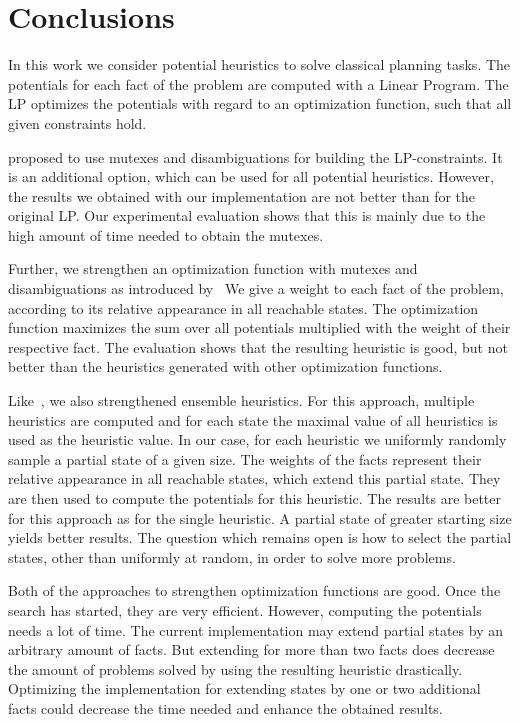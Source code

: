 \chapter{Conclusions}\label{ch:conclusions}
In this work we consider potential heuristics to solve classical planning tasks.
The potentials for each fact of the problem are computed with a Linear Program.
The LP optimizes the potentials with regard to an optimization function, such that all given constraints hold.

\citeauthor{fivser2020strengthening} proposed to use mutexes and disambiguations for building the LP-constraints.
It is an additional option, which can be used for all potential heuristics.
However, the results we obtained with our implementation are not better than for the original LP.
Our experimental evaluation shows that this is mainly due to the high amount of time needed to obtain the mutexes.

Further, we strengthen an optimization function with mutexes and disambiguations as introduced by~\citeauthor{fivser2020strengthening}
We give a weight to each fact of the problem, according to its relative appearance in all reachable states.
The optimization function maximizes the sum over all potentials multiplied with the weight of their respective fact.
The evaluation shows that the resulting heuristic is good, but not better than the heuristics generated with other optimization functions.

Like~\citeauthor{fivser2020strengthening}, we also strengthened ensemble heuristics.
For this approach, multiple heuristics are computed and for each state the maximal value of all heuristics is used as the heuristic value.
In our case, for each heuristic we uniformly randomly sample a partial state of a given size.
The weights of the facts represent their relative appearance in all reachable states, which extend this partial state.
They are then used to compute the potentials for this heuristic.
The results are better for this approach as for the single heuristic.
A partial state of greater starting size yields better results.
The question which remains open is how to select the partial states, other than uniformly at random, in order to solve more problems.

Both of the approaches to strengthen optimization functions are good.
Once the search has started, they are very efficient.
However, computing the potentials needs a lot of time.
The current implementation may extend partial states by an arbitrary amount of facts.
But extending for more than two facts does decrease the amount of problems solved by using the resulting heuristic drastically.
Optimizing the implementation for extending states by one or two additional facts could decrease the time needed and enhance the obtained results.

